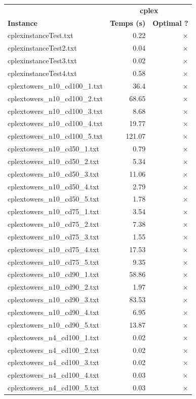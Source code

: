 \documentclass{article}
\begin{document}
\begin{center}
\renewcommand{\arraystretch}{1.4} 
 \begin{tabular}{lrr}
	\hline
 & \multicolumn{2}{c}{\textbf{cplex}}\\
\textbf{Instance}  & \textbf{Temps (s)} & \textbf{Optimal ?} \\\hline

cplexinstanceTest.txt & 0.22 & 
$\times$
\\
cplexinstanceTest2.txt & 0.04 & 
$\times$
\\
cplexinstanceTest3.txt & 0.02 & 
$\times$
\\
cplexinstanceTest4.txt & 0.58 & 
$\times$
\\
cplextowers\_n10\_cd100\_1.txt & 36.4 & 
$\times$
\\
cplextowers\_n10\_cd100\_2.txt & 68.65 & 
$\times$
\\
cplextowers\_n10\_cd100\_3.txt & 8.68 & 
$\times$
\\
cplextowers\_n10\_cd100\_4.txt & 19.77 & 
$\times$
\\
cplextowers\_n10\_cd100\_5.txt & 121.07 & 
$\times$
\\
cplextowers\_n10\_cd50\_1.txt & 0.79 & 
$\times$
\\
cplextowers\_n10\_cd50\_2.txt & 5.34 & 
$\times$
\\
cplextowers\_n10\_cd50\_3.txt & 11.06 & 
$\times$
\\
cplextowers\_n10\_cd50\_4.txt & 2.79 & 
$\times$
\\
cplextowers\_n10\_cd50\_5.txt & 1.78 & 
$\times$
\\
cplextowers\_n10\_cd75\_1.txt & 3.54 & 
$\times$
\\
cplextowers\_n10\_cd75\_2.txt & 7.38 & 
$\times$
\\
cplextowers\_n10\_cd75\_3.txt & 1.55 & 
$\times$
\\
cplextowers\_n10\_cd75\_4.txt & 17.53 & 
$\times$
\\
cplextowers\_n10\_cd75\_5.txt & 9.35 & 
$\times$
\\
cplextowers\_n10\_cd90\_1.txt & 58.86 & 
$\times$
\\
cplextowers\_n10\_cd90\_2.txt & 1.97 & 
$\times$
\\
cplextowers\_n10\_cd90\_3.txt & 83.53 & 
$\times$
\\
cplextowers\_n10\_cd90\_4.txt & 6.95 & 
$\times$
\\
cplextowers\_n10\_cd90\_5.txt & 13.87 & 
$\times$
\\
cplextowers\_n4\_cd100\_1.txt & 0.02 & 
$\times$
\\
cplextowers\_n4\_cd100\_2.txt & 0.02 & 
$\times$
\\
cplextowers\_n4\_cd100\_3.txt & 0.02 & 
$\times$
\\
cplextowers\_n4\_cd100\_4.txt & 0.03 & 
$\times$
\\
cplextowers\_n4\_cd100\_5.txt & 0.03 & 
$\times$
\\
\hline\end{tabular}
\end{center}
\end{document}

